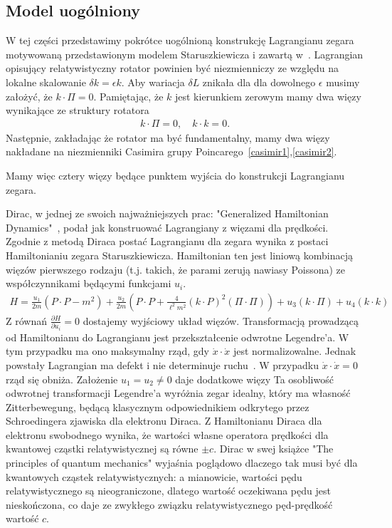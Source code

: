 \subsection{Model uogólniony}
W tej części przedstawimy pokrótce uogólnioną konstrukcję 
Lagrangianu zegara motywowaną przedstawionym
 modelem Staruszkiewicza i zawartą w~\cite{Bratek2015wiele}.
Lagrangian opisujący relatywistyczny rotator powinien być 
niezmienniczy ze względu na lokalne skalowanie 
$\delta k =\epsilon k$. Aby wariacja 
$\delta L $ znikała dla dla dowolnego $\epsilon$ musimy założyć, że
 $k \cdot \Pi = 0$. Pamiętając, że $k$ jest kierunkiem zerowym 
mamy dwa więzy wynikające ze struktury rotatora
\begin{align}\label{W1}
k \cdot \Pi = 0, \quad k \cdot k = 0. \tag{W1}
\end{align}
Następnie, zakładając że rotator ma być fundamentalny, 
mamy dwa więzy nakładane na niezmienniki Casimira 
grupy Poincarego~\ref{casimir1},\ref{casimir2}.

 
Mamy więc cztery więzy będące punktem wyjścia
do konstrukcji Lagrangianu zegara.

Dirac, w jednej ze swoich najważniejszych prac: 
"Generalized Hamiltonian Dynamics"~\cite{DiracHam}, podał
jak konstruować Lagrangiany z więzami dla prędkości.
Zgodnie z metodą Diraca postać Lagrangianu dla zegara wynika 
z postaci Hamiltonianiu zegara Staruszkiewicza. Hamiltonian
ten jest liniową kombinacją więzów pierwszego rodzaju (t.j. 
takich, że parami zerują nawiasy Poissona) ze współczynnikami będącymi 
funkcjami $u_i$. 
\begin{align*}
H = \frac{u_1}{2m} \left(P\cdot P -m^2 \right) 
+ \frac{u_2}{2m } \left( P\cdot P + \frac{4}{\ell^2 m^2} (k\cdot P)^2 
(\Pi \cdot \Pi) \right)
+ u_3 (k \cdot \Pi ) + u_4 (k \cdot k)
\end{align*}
Z równań $\frac{\partial H}{\partial u_i} = 0 $ dostajemy wyjściowy
układ więzów. 
Transformacją
prowadzącą od Hamiltonianu do Lagrangianu jest 
przekształcenie odwrotne Legendre'a. 
W tym przypadku ma ono maksymalny rząd, gdy $\dot{x} \cdot \dot{x}$ 
jest normalizowalne. Jednak powstały Lagrangian
ma defekt i nie determinuje ruchu~\cite{Bratek2015wiele}.
W przypadku $\dot{x} \cdot \dot{x} = 0$  rząd się obniża. Założenie 
$u_1 = u_2 \neq 0$ daje dodatkowe więzy 
Ta osobliwość  odwrotnej transformacji Legendre'a 
wyróżnia zegar idealny, który ma własność
Zitterbewegung, będącą klasycznym odpowiednikiem 
odkrytego przez Schroedingera zjawiska dla elektronu Diraca. 
Z Hamiltonianu Diraca dla elektronu swobodnego wynika, że 
wartości własne operatora prędkości dla kwantowej cząstki
relatywistycznej są równe $\pm c$. 
Dirac w swej książce "The principles of
quantum mechanics" wyjaśnia poglądowo dlaczego tak musi być dla kwantowych
cząstek relatywistycznych: a mianowicie, wartości pędu relatywistycznego
są nieograniczone, dlatego wartość oczekiwana pędu jest nieskończona, co
daje ze zwykłego związku relatywistycznego pęd-prędkość wartość $c$.


